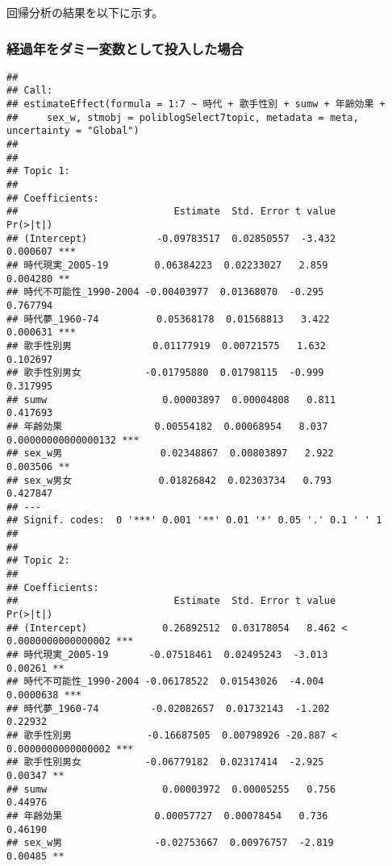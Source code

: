 \documentclass[
]{article}
\begin{document}
回帰分析の結果を以下に示す。

\hypertarget{ux7d4cux904eux5e74ux3092ux30c0ux30dfux30fcux5909ux6570ux3068ux3057ux3066ux6295ux5165ux3057ux305fux5834ux5408}{%
\subsubsection{経過年をダミー変数として投入した場合}\label{ux7d4cux904eux5e74ux3092ux30c0ux30dfux30fcux5909ux6570ux3068ux3057ux3066ux6295ux5165ux3057ux305fux5834ux5408}}

\begin{verbatim}
## 
## Call:
## estimateEffect(formula = 1:7 ~ 時代 + 歌手性別 + sumw + 年齢効果 + 
##     sex_w, stmobj = poliblogSelect7topic, metadata = meta, uncertainty = "Global")
## 
## 
## Topic 1:
## 
## Coefficients:
##                           Estimate  Std. Error t value            Pr(>|t|)    
## (Intercept)            -0.09783517  0.02850557  -3.432            0.000607 ***
## 時代現実_2005-19        0.06384223  0.02233027   2.859            0.004280 ** 
## 時代不可能性_1990-2004 -0.00403977  0.01368070  -0.295            0.767794    
## 時代夢_1960-74          0.05368178  0.01568813   3.422            0.000631 ***
## 歌手性別男              0.01177919  0.00721575   1.632            0.102697    
## 歌手性別男女           -0.01795880  0.01798115  -0.999            0.317995    
## sumw                    0.00003897  0.00004808   0.811            0.417693    
## 年齢効果                0.00554182  0.00068954   8.037 0.00000000000000132 ***
## sex_w男                 0.02348867  0.00803897   2.922            0.003506 ** 
## sex_w男女               0.01826842  0.02303734   0.793            0.427847    
## ---
## Signif. codes:  0 '***' 0.001 '**' 0.01 '*' 0.05 '.' 0.1 ' ' 1
## 
## 
## Topic 2:
## 
## Coefficients:
##                           Estimate  Std. Error t value             Pr(>|t|)    
## (Intercept)             0.26892512  0.03178054   8.462 < 0.0000000000000002 ***
## 時代現実_2005-19       -0.07518461  0.02495243  -3.013              0.00261 ** 
## 時代不可能性_1990-2004 -0.06178522  0.01543026  -4.004            0.0000638 ***
## 時代夢_1960-74         -0.02082657  0.01732143  -1.202              0.22932    
## 歌手性別男             -0.16687505  0.00798926 -20.887 < 0.0000000000000002 ***
## 歌手性別男女           -0.06779182  0.02317414  -2.925              0.00347 ** 
## sumw                    0.00003972  0.00005255   0.756              0.44976    
## 年齢効果                0.00057727  0.00078454   0.736              0.46190    
## sex_w男                -0.02753667  0.00976757  -2.819              0.00485 ** 

\end{verbatim}
\end{document}

